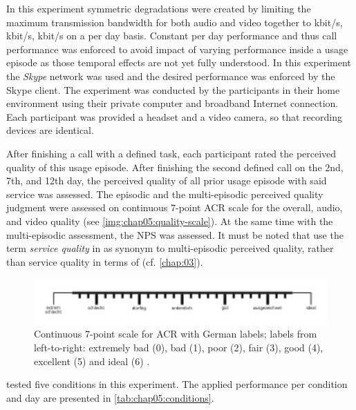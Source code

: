 In this experiment symmetric degradations were created by limiting the maximum transmission bandwidth for both audio and video together to \unit[500]{kbit/s}, \unit[150]{kbit/s}, \unit[32]{kbit/s} on a per day basis.
Constant per day performance and thus call performance was enforced to avoid impact of varying performance inside a usage episode as those temporal effects are not yet fully understood.
In this experiment the \emph{Skype} network was used and the desired performance was enforced by the Skype client.
The experiment was conducted by the participants in their home environment using their private computer and broadband Internet connection.
Each participant was provided a headset and a video camera, so that recording devices are identical.

After finishing a call with a defined task, each participant rated the perceived quality of this usage episode.
After finishing the second defined call on the 2nd, 7th, and 12th day, the perceived quality of all prior usage episode with said service was assessed.
The episodic and the multi-episodic perceived quality judgment were assessed on continuous 7-point \ac{ACR} scale \citep[cf.][p. 19]{itu-t_p.851:_2003} for the overall, audio, and video quality (see \autoref{img:chap05:quality-scale}).
At the same time with the multi-episodic assessment, the \ac{NPS} was assessed.
It must be noted that \cite{moller_single-call_2011} use the term \emph{service quality} in as synonym to multi-episodic perceived quality, rather than service quality in terms of \cite{parasuraman_conceptual_1985} (cf. \autoref{chap:03}).

\begin{figure}[h]
	\includegraphics[width=1\textwidth]{fig/quality7pt_scale}
	\caption{Continuous 7-point scale for \ac{ACR} with German labels; labels from left-to-right: extremely bad (0), bad (1), poor (2), fair (3), good (4), excellent (5) and ideal (6) \citep{itu-t_p.805:_2007}.}
	\label{img:chap05:quality-scale}
\end{figure}

\cite{moller_single-call_2011} tested five conditions in this experiment.
The applied performance per condition and day are presented in \autoref{tab:chap05:conditions}.

